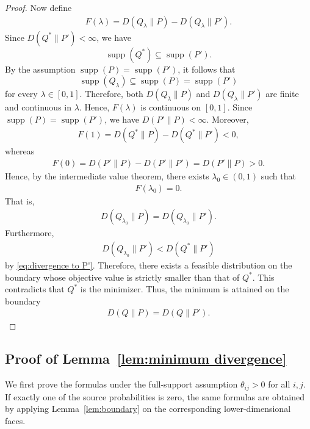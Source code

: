 \documentclass[journal,onecolumn]{IEEEtran}
\theoremstyle{definition}
\theoremstyle{remark}
\begin{document}
\begin{proof}
    Now define
    \begin{align*}
        F(\lambda)=D(Q_\lambda\|P)-D(Q_\lambda\|P').
    \end{align*}
    Since \(D(Q^*\|P')<\infty\), we have
    \[
    \operatorname{supp}(Q^*)\subseteq \operatorname{supp}(P').
    \]
    By the assumption \(\operatorname{supp}(P)=\operatorname{supp}(P')\),
    it follows that
    \[
    \operatorname{supp}(Q_\lambda)\subseteq \operatorname{supp}(P)
    =\operatorname{supp}(P')
    \]
    for every \(\lambda\in[0,1]\). Therefore, both
    \(D(Q_\lambda\|P)\) and \(D(Q_\lambda\|P')\) are finite and continuous
    in \(\lambda\). Hence, \(F(\lambda)\) is continuous on \([0,1]\).
    Since $\operatorname{supp}(P)=\operatorname{supp}(P')$, we have $D(P'\|P)<\infty$.
    Moreover,
    \begin{align*}
        F(1)=D(Q^*\|P)-D(Q^*\|P')<0,
    \end{align*}
    whereas
    \begin{align*}
        F(0)=D(P'\|P)-D(P'\|P')=D(P'\|P)>0.
    \end{align*}
    Hence, by the intermediate value theorem, there exists $\lambda_0\in(0,1)$ such that
    \begin{align*}
        F(\lambda_0)=0.
    \end{align*}
    That is,
    \begin{align*}
        D(Q_{\lambda_0}\|P)=D(Q_{\lambda_0}\|P').
    \end{align*}
    Furthermore,
    \begin{align*}
        D(Q_{\lambda_0}\|P') < D(Q^*\|P')
    \end{align*}
    by \eqref{eq:divergence to P'}.
    Therefore, there exists a feasible distribution on the boundary whose objective value is strictly smaller than that of $Q^*$.
    This contradicts that $Q^*$ is the minimizer. 
    Thus, the minimum is attained on the boundary
    \begin{align*}
        D(Q\|P)=D(Q\|P').
    \end{align*}
    \end{proof}
   

    \subsection{Proof of Lemma~\ref{lem:minimum divergence}}\label{prf:optimization}
    We first prove the formulas under the full-support assumption $\theta_{ij}>0$ for all $i,j$.
    If exactly one of the source probabilities is zero, the same formulas are obtained by applying Lemma~\ref{lem:boundary} on the corresponding lower-dimensional faces.
\end{document}
